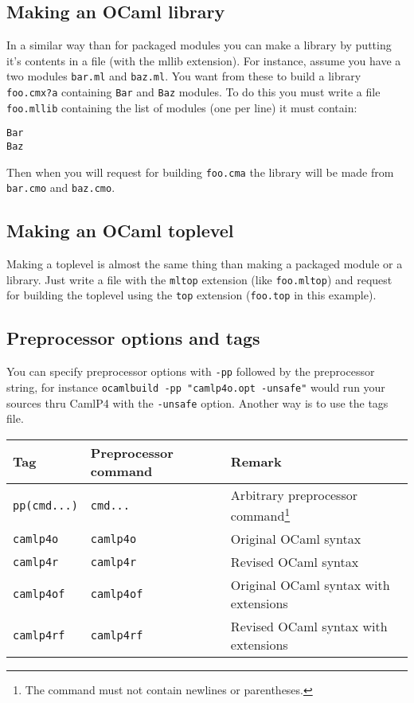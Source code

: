 \documentclass[9pt]{article}
\begin{document}
\subsection{Making an OCaml library}
In  a  similar  way than for packaged modules you can make a library by putting
it's  contents  in  a file (with the mllib extension). For instance, assume you
have  a two modules \texttt{bar.ml} and \texttt{baz.ml}. You want from these to
build  a  library  \texttt{foo.cmx?a}  containing \texttt{Bar} and \texttt{Baz}
modules.  To  do  this  you must write a file \texttt{foo.mllib} containing the
list of modules (one per line) it must contain:
\begin{verbatim}
Bar
Baz
\end{verbatim}
Then  when  you  will request for building \texttt{foo.cma} the library will be
made from \texttt{bar.cmo} and \texttt{baz.cmo}.
\subsection{Making an OCaml toplevel}
Making  a  toplevel is almost the same thing than making a packaged module or a
library.   Just   write   a   file  with  the  \texttt{mltop}  extension  (like
\texttt{foo.mltop})   and   request   for   building  the  toplevel  using  the
\texttt{top} extension (\texttt{foo.top} in this example).
\subsection{Preprocessor options and tags}
You can specify preprocessor options with \texttt{-pp} followed by the
preprocessor string, for instance \texttt{ocamlbuild -pp "camlp4o.opt -unsafe"}
would run your sources thru CamlP4 with the \texttt{-unsafe} option.
Another way is to use the tags file.
\begin{center}
  \begin{tabular}{|l|l|l|}
    \hline
    \textbf{Tag}        & \textbf{Preprocessor command} & \textbf{Remark} \\
    \hline
    \hline
    \texttt{pp(cmd...)} & \texttt{cmd...}               & Arbitrary
        preprocessor command\footnote{The command must not contain newlines or parentheses.} \\
    \hline
    \texttt{camlp4o}    & \texttt{camlp4o}              & Original OCaml syntax \\
    \hline
    \texttt{camlp4r}    & \texttt{camlp4r}              & Revised OCaml syntax \\
    \hline
    \texttt{camlp4of}   & \texttt{camlp4of}             & Original OCaml syntax with extensions \\
    \hline
    \texttt{camlp4rf}   & \texttt{camlp4rf}             & Revised OCaml syntax with extensions \\
    \hline
  \end{tabular}
\end{center}
\end{document}
